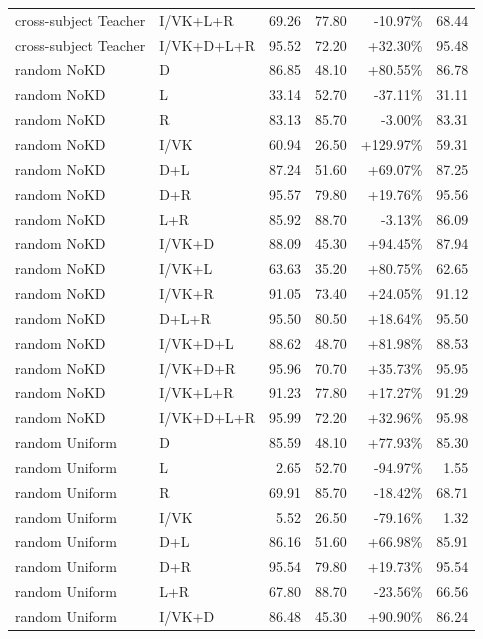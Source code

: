 \documentclass[UTF8,10pt]{ctexart}
\newcommand{\better}[1]{\textcolor{goodblue}{#1}}
\newcommand{\worse}[1]{\textcolor{badred}{#1}}
\begin{document}
{\begin{longtable}{llrrrr}
cross-subject Teacher & I/VK+L+R & 69.26 & 77.80 & \worse{-10.97\%} & 68.44\\
cross-subject Teacher & I/VK+D+L+R & 95.52 & 72.20 & \better{+32.30\%} & 95.48\\
random NoKD & D & 86.85 & 48.10 & \better{+80.55\%} & 86.78\\
random NoKD & L & 33.14 & 52.70 & \worse{-37.11\%} & 31.11\\
random NoKD & R & 83.13 & 85.70 & \worse{-3.00\%} & 83.31\\
random NoKD & I/VK & 60.94 & 26.50 & \better{+129.97\%} & 59.31\\
random NoKD & D+L & 87.24 & 51.60 & \better{+69.07\%} & 87.25\\
random NoKD & D+R & 95.57 & 79.80 & \better{+19.76\%} & 95.56\\
random NoKD & L+R & 85.92 & 88.70 & \worse{-3.13\%} & 86.09\\
random NoKD & I/VK+D & 88.09 & 45.30 & \better{+94.45\%} & 87.94\\
random NoKD & I/VK+L & 63.63 & 35.20 & \better{+80.75\%} & 62.65\\
random NoKD & I/VK+R & 91.05 & 73.40 & \better{+24.05\%} & 91.12\\
random NoKD & D+L+R & 95.50 & 80.50 & \better{+18.64\%} & 95.50\\
random NoKD & I/VK+D+L & 88.62 & 48.70 & \better{+81.98\%} & 88.53\\
random NoKD & I/VK+D+R & 95.96 & 70.70 & \better{+35.73\%} & 95.95\\
random NoKD & I/VK+L+R & 91.23 & 77.80 & \better{+17.27\%} & 91.29\\
random NoKD & I/VK+D+L+R & 95.99 & 72.20 & \better{+32.96\%} & 95.98\\
random Uniform & D & 85.59 & 48.10 & \better{+77.93\%} & 85.30\\
random Uniform & L & 2.65 & 52.70 & \worse{-94.97\%} & 1.55\\
random Uniform & R & 69.91 & 85.70 & \worse{-18.42\%} & 68.71\\
random Uniform & I/VK & 5.52 & 26.50 & \worse{-79.16\%} & 1.32\\
random Uniform & D+L & 86.16 & 51.60 & \better{+66.98\%} & 85.91\\
random Uniform & D+R & 95.54 & 79.80 & \better{+19.73\%} & 95.54\\
random Uniform & L+R & 67.80 & 88.70 & \worse{-23.56\%} & 66.56\\
random Uniform & I/VK+D & 86.48 & 45.30 & \better{+90.90\%} & 86.24\\

\end{longtable}}
\end{document}
